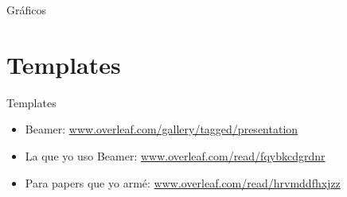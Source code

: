 \documentclass[handout,t]{beamer}
\begin{document}
  \begin{frame}[fragile,c]{Gráficos}
        \resizebox{.8\textwidth}{!}{
        \hspace{10cm}
        }
        \resizebox{.8\textwidth}{!}{
        \hspace{7cm}
        }
\end{frame}
  

\section{Templates} 
     \begin{frame}[c]{Templates}
     \begin{itemize}
         \item Beamer: \url{www.overleaf.com/gallery/tagged/presentation}
         \item La que yo uso Beamer: \url{www.overleaf.com/read/fqybkcdgrdnr}
         \item Para papers que yo armé: \url{www.overleaf.com/read/hrvmddfhxjzz}
     \end{itemize}

  \end{frame}
\end{document}
